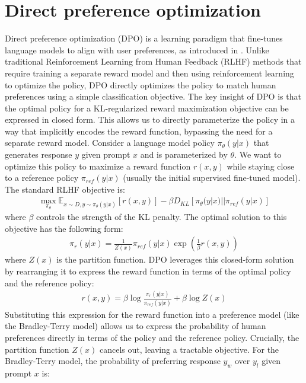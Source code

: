 \section{Direct preference optimization}
Direct preference optimization (DPO) is a learning paradigm that fine-tunes language models to align with user preferences, as introduced in \cite{rafailov2024direct}. Unlike traditional Reinforcement Learning from Human Feedback (RLHF) methods \cite{NIPS2017_d5e2c0ad} that require training a separate reward model and then using reinforcement learning to optimize the policy, DPO directly optimizes the policy to match human preferences using a simple classification objective.
The key insight of DPO is that the optimal policy for a KL-regularized reward maximization objective can be expressed in closed form. This allows us to directly parameterize the policy in a way that implicitly encodes the reward function, bypassing the need for a separate reward model.
Consider a language model policy $\pi_\theta(y|x)$ that generates response $y$ given prompt $x$ and is parameterized by $\theta$. We want to optimize this policy to maximize a reward function $r(x,y)$ while staying close to a reference policy $\pi_{ref}(y|x)$ (usually the initial supervised fine-tuned model). The standard RLHF objective is:
\begin{align}
\max_{\pi_\theta} \mathbb{E}_{x \sim D, y \sim \pi_\theta(y|x)} [ r(x, y)] - \beta D_{KL}[\pi_\theta(y | x) || \pi_{ref}(y | x)]
\end{align}
where $\beta$ controls the strength of the KL penalty.
The optimal solution to this objective has the following form:
\begin{align}
\pi_r(y | x) = \frac{1}{Z(x)} \pi_{ref}(y | x) \exp \left( \frac{1}{\beta} r(x, y) \right)
\end{align}
where $Z(x)$ is the partition function.
DPO leverages this closed-form solution by rearranging it to express the reward function in terms of the optimal policy and the reference policy:
\begin{align}
r(x, y) = \beta \log \frac{\pi_r(y | x)}{\pi_{ref}(y | x)} + \beta \log Z(x)
\end{align}
Substituting this expression for the reward function into a preference model (like the Bradley-Terry model) allows us to express the probability of human preferences directly in terms of the policy and the reference policy. Crucially, the partition function $Z(x)$ cancels out, leaving a tractable objective.
For the Bradley-Terry model, the probability of preferring response $y_w$ over $y_l$ given prompt $x$ is:
